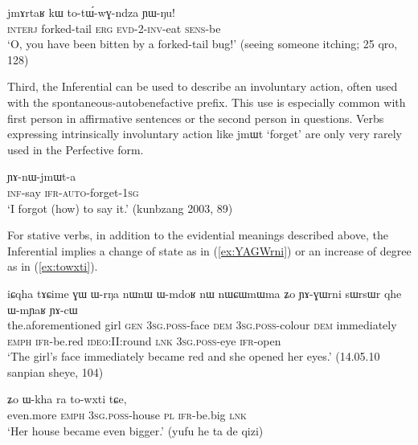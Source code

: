 \documentclass[oldfontcommands,oneside,a4paper,11pt]{article}
\newcommand{\ipa}[1]{{\phon \mbox{#1}}} %
\newcommand{\refb}[1]{(\ref{#1})}
\begin{document}
\begin{exe}
\ex \label{ex:totWwGndza}
\gll \ipa{wo}	\ipa{jmɤrtaʁ} 	\ipa{kɯ} 	\ipa{to-tɯ́-wɣ-ndza} 	\ipa{ɲɯ-ŋu!} \\
\textsc{interj} forked-tail \textsc{erg} \textsc{evd-2-inv}-eat \textsc{sens}-be\\
\glt `O, you have been bitten by a forked-tail bug!' (seeing someone itching; 25 qro, 128)
\end{exe}

Third, the Inferential can be used to describe an involuntary action, often used with the spontaneous-autobenefactive prefix. This use is especially common with first person in affirmative sentences or the second person in questions. Verbs expressing intrinsically involuntary action like \ipa{jmɯt} `forget' are only very rarely used in the Perfective form.

\begin{exe}
\ex 
\gll \ipa{kɤ-ti} \ipa{ɲɤ-nɯ-jmɯt-a} \\
\textsc{inf}-say  \textsc{ifr-auto}-forget-\textsc{1sg} \\
\glt `I forgot (how) to say it.' (kunbzang 2003, 89)
\end{exe}

For stative verbs, in addition to the evidential meanings described above, the Inferential implies a change of state as in \refb{ex:YAGWrni} or an increase of degree as in \refb{ex:towxti}.

\begin{exe}
\ex \label{ex:YAGWrni}
\gll 
\ipa{iɕqha} 	\ipa{tɤɕime} 	\ipa{ɣɯ} 	\ipa{ɯ-rŋa} 	\ipa{nɯnɯ} 	\ipa{ɯ-mdoʁ} 	\ipa{nɯ} 	\ipa{nɯɕɯmɯma} 	\ipa{ʑo} 	\ipa{ɲɤ-ɣɯrni} 	\ipa{sɯrsɯr} 	\ipa{qhe} 	\ipa{ɯ-mɲaʁ} 	\ipa{ɲɤ-cɯ}\\
the.aforementioned girl \textsc{gen} \textsc{3sg.poss}-face \textsc{dem} \textsc{3sg.poss}-colour \textsc{dem} immediately \textsc{emph} \textsc{ifr}-be.red \textsc{ideo}:II:round \textsc{lnk} \textsc{3sg.poss}-eye \textsc{ifr}-open \\
\glt `The girl's face immediately became red and she opened her eyes.' (14.05.10 sanpian sheye, 104)
\end{exe}

\begin{exe}
\ex \label{ex:towxti}
\gll \ipa{mɤʑɯ} 	\ipa{ʑo} 	\ipa{ɯ-kha} 	\ipa{ra} 	\ipa{to-wxti} 	\ipa{tɕe,} \\
even.more \textsc{emph} \textsc{3sg.poss}-house \textsc{pl} \textsc{ifr}-be.big \textsc{lnk} \\
\glt `Her house became even bigger.' (yufu he ta de qizi)
\end{exe}
\end{document}
